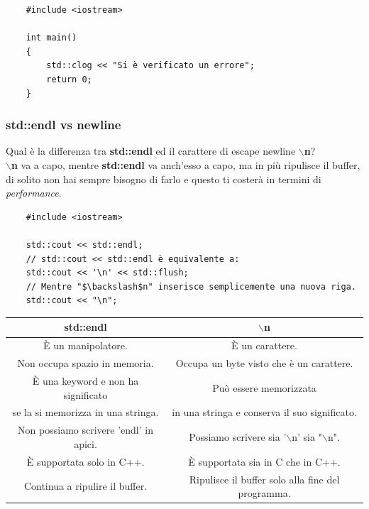 \begin{lstlisting}
	#include <iostream>
	
	int main()
	{
		std::clog << "Si è verificato un errore";
		return 0;
	}
\end{lstlisting}

\subsubsection{std::endl vs newline}

\textsf{\small Qual è la differenza tra \textbf{std::endl} ed il carattere di escape newline \textbf{$\backslash$n}?} \\

\textsf{\small \textbf{$\backslash$n} va a capo, mentre \textbf{std::endl} va anch'esso a capo, ma in più ripulisce il buffer, di solito non hai sempre bisogno di farlo e questo ti costerà in termini di \emph{performance}.} \break

\begin{lstlisting}
	#include <iostream>
	
	std::cout << std::endl;
	// std::cout << std::endl è equivalente a:
	std::cout << '\n' << std::flush;
	// Mentre "$\backslash$n" inserisce semplicemente una nuova riga.
	std::cout << "\n";
\end{lstlisting} 

\begin{tabular}{|c|c|}
	\hline
	\textbf{std::endl} & \textbf{\small $\backslash$n} \\
	\hline
	\textsf{\small È un manipolatore.} & \textsf{\small È un carattere.} \\
	\hline
	\textsf{\small Non occupa spazio in memoria.} & \textsf{\small Occupa un byte visto che è un carattere.} \\
	\hline
	\textsf{\small È una keyword e non ha significato } & \textsf{\small Può essere memorizzata } \\
	\textsf{\small se la si memorizza in una stringa.} & \textsf{\small in una stringa e conserva il suo significato.} \\
	\hline
	\textsf{\small Non possiamo scrivere 'endl' in apici.} & \textsf{\small Possiamo scrivere sia '$\backslash$n' sia "$\backslash$n".} \\
	\hline
	\textsf{\small È supportata solo in C++.} & \textsf{\small È supportata sia in C che in C++.} \\
	\hline
	\textsf{\small Continua a ripulire il buffer.} & \textsf{\small Ripulisce il buffer solo alla fine del programma.} \\
	\hline
\end{tabular}

